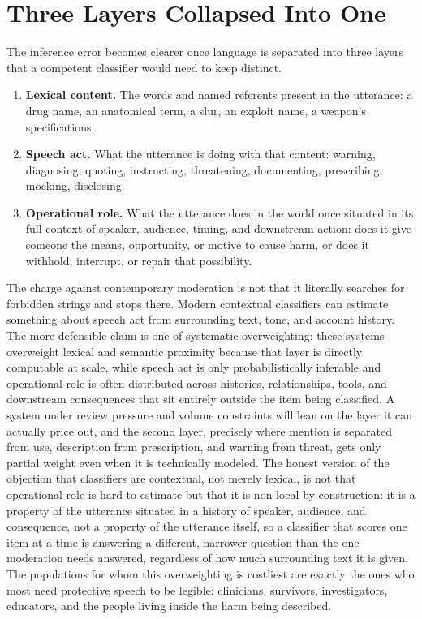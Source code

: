\documentclass[11pt]{article}
\begin{document}
\section{Three Layers Collapsed Into One}

The inference error becomes clearer once language is separated into three layers that a competent classifier would need to keep distinct.

\begin{enumerate}[leftmargin=*]
\item \textbf{Lexical content.} The words and named referents present in the utterance: a drug name, an anatomical term, a slur, an exploit name, a weapon's specifications.
\item \textbf{Speech act.} What the utterance is doing with that content: warning, diagnosing, quoting, instructing, threatening, documenting, prescribing, mocking, disclosing.
\item \textbf{Operational role.} What the utterance does in the world once situated in its full context of speaker, audience, timing, and downstream action: does it give someone the means, opportunity, or motive to cause harm, or does it withhold, interrupt, or repair that possibility.
\end{enumerate}

The charge against contemporary moderation is not that it literally searches for forbidden strings and stops there. Modern contextual classifiers can estimate something about speech act from surrounding text, tone, and account history. The more defensible claim is one of systematic overweighting: these systems overweight lexical and semantic proximity because that layer is directly computable at scale, while speech act is only probabilistically inferable and operational role is often distributed across histories, relationships, tools, and downstream consequences that sit entirely outside the item being classified. A system under review pressure and volume constraints will lean on the layer it can actually price out, and the second layer, precisely where mention is separated from use, description from prescription, and warning from threat, gets only partial weight even when it is technically modeled. The honest version of the objection that classifiers are contextual, not merely lexical, is not that operational role is hard to estimate but that it is non-local by construction: it is a property of the utterance situated in a history of speaker, audience, and consequence, not a property of the utterance itself, so a classifier that scores one item at a time is answering a different, narrower question than the one moderation needs answered, regardless of how much surrounding text it is given. The populations for whom this overweighting is costliest are exactly the ones who most need protective speech to be legible: clinicians, survivors, investigators, educators, and the people living inside the harm being described.
\end{document}
